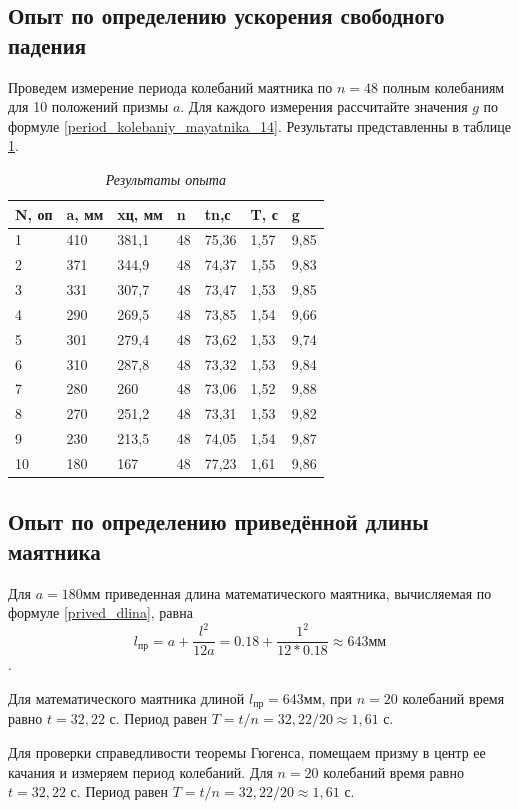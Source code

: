 \documentclass[a4paper,12pt]{article}
\begin{document}
\subsection{Опыт по определению ускорения свободного падения}

Проведем измерение периода колебаний маятника по $n = 48$ полным колебаниям для 10 положений призмы $a$. Для каждого измерения рассчитайте значения $g$ по формуле \eqref{period_kolebaniy_mayatnika_14}. Результаты представленны в таблице \ref{rez_opita}.


\begin{table}[h]
\caption{\textit{Результаты опыта}}
\label{rez_opita}
\begin{tabular}{|l|l|l|l|l|l|l|}
\hline
N, оп & a, мм & xц, мм & n  & tn,с  & T, с & g    \\ \hline
1     & 410   & 381,1  & 48 & 75,36 & 1,57 & 9,85 \\ \hline
2     & 371   & 344,9  & 48 & 74,37 & 1,55 & 9,83 \\ \hline
3     & 331   & 307,7  & 48 & 73,47 & 1,53 & 9,85 \\ \hline
4     & 290   & 269,5  & 48 & 73,85 & 1,54 & 9,66 \\ \hline
5     & 301   & 279,4  & 48 & 73,62 & 1,53 & 9,74 \\ \hline
6     & 310   & 287,8  & 48 & 73,32 & 1,53 & 9,84 \\ \hline
7     & 280   & 260    & 48 & 73,06 & 1,52 & 9,88 \\ \hline
8     & 270   & 251,2  & 48 & 73,31 & 1,53 & 9,82 \\ \hline
9     & 230   & 213,5  & 48 & 74,05 & 1,54 & 9,87 \\ \hline
10    & 180   & 167    & 48 & 77,23 & 1,61 & 9,86 \\ \hline
\end{tabular}
\end{table}


\subsection{Опыт по определению приведённой длины маятника}

Для $a = 180мм$ приведенная длина математического маятника, вычисляемая по формуле \ref{prived_dlina}, равна
\[ l_{\text{пр}} = a + \dfrac{l^2}{12a} = 0.18 + \dfrac{1^2}{12*0.18} \approx 643  \text{мм} \].


Для математического маятника длиной $l_{\text{пр}} = 643 \text{мм}$, при $n = 20$ колебаний время равно $t = 32,22$ с. Период равен $T = t/n = 32,22/20 \approx 1,61$ с.


Для проверки справедливости теоремы Гюгенса, помещаем призму в центр ее качания и измеряем период колебаний. Для $n = 20$ колебаний время равно $t = 32,22$ с. Период равен $T = t/n = 32,22/20 \approx 1,61$ с.
\end{document}
